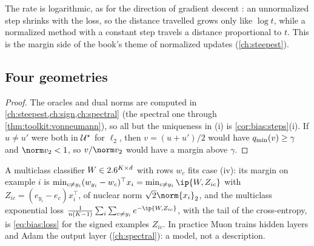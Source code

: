 \begin{refsection}
The rate is logarithmic, as for the direction of gradient descent \parencite{SoudryEtAl2018}: an unnormalized step shrinks with the loss, so the distance travelled grows only like $\log t$, while a normalized method with a constant step travels a distance proportional to $t$. This is the margin side of the book's theme of normalized updates (\cref{ch:steepest}).

\subsection{Four geometries}


\begin{proof}
The oracles and dual norms are computed in \cref{ch:steepest,ch:sign,ch:spectral} (the spectral one through \cref{thm:toolkit:vonneumann}), so all but the uniqueness in (i) is \cref{cor:bias:steps}(i). If $u\ne u'$ were both in $\mathcal{U}^\star$ for $\ell_2$, then $v=(u+u')/2$ would have $q_{\min}(v)\ge\gamma$ and $\norm v_2<1$, so $v/\norm v_2$ would have a margin above $\gamma$.
\end{proof}

A multiclass classifier $W\in2.6^{K\times d}$ with rows $w_c$ fits case (iv): its margin on example $i$ is $\min_{c\ne y_i}(w_{y_i}-w_c)^\top x_i=\min_{c\ne y_i}\ip{W,Z_{ic}}$ with $Z_{ic}=(e_{y_i}-e_c)x_i^\top$, of nuclear norm $\sqrt2\norm{x_i}_2$, and the multiclass exponential loss $\frac1{n(K-1)}\sum_i\sum_{c\ne y_i}e^{-\ip{W,Z_{ic}}}$, with the tail of the cross-entropy, is \eqref{eq:bias:loss} for the signed examples $Z_{ic}$. In practice Muon trains hidden layers and Adam the output layer (\cref{ch:spectral}): a model, not a description.


\end{refsection}
